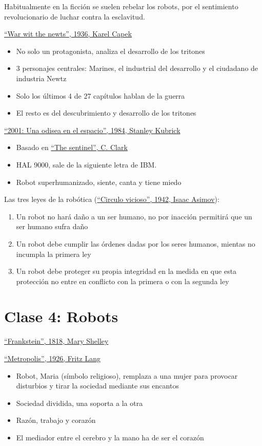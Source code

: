 \documentclass[12pt, twoside, openright]{report} %
\begin{document}
Habitualmente en la ficción se suelen rebelar los robots, por el sentimiento revolucionario de luchar contra la esclavitud.

\underline{\enquote{War wit the newts}, 1936, Karel Capek}
\begin{itemize}
	\item No solo un protagonista, analiza el desarrollo de los tritones
	\item 3 personajes centrales: Marines, el industrial del desarrollo y el ciudadano de industria Newtz
	\item Solo los últimos 4 de 27 capítulos hablan de la guerra
	\item El resto es del descubrimiento y desarrollo de los tritones
\end{itemize}

\underline{\enquote{2001: Una odisea en el espacio}, 1984, Stanley Kubrick}
\begin{itemize}
	\item Basado en \underline{\enquote{The sentinel}, C. Clark}
	\item HAL 9000, sale de la siguiente letra de IBM.
	\item Robot superhumanizado, siente, canta y tiene miedo
\end{itemize}

Las tres leyes de la robótica (\underline{\enquote{Circulo vicioso}, 1942, Isaac Asimov}):
\begin{enumerate}
	\item Un robot no hará daño a un ser humano, no por inacción permitirá que un ser humano sufra daño
	\item Un robot debe cumplir las órdenes dadas por los seres humanos, mientas no incumpla la primera ley
	\item Un robot debe proteger su propia integridad en la medida en que esta protección no entre en conflicto con la primera o con la segunda ley
\end{enumerate}

\chapter{Clase 4: Robots}
\underline{\enquote{Frankstein}, 1818, Mary Shelley}

\underline{\enquote{Metropolis}, 1926, Fritz Lang}
\begin{itemize}
	\item Robot, Maria (símbolo religioso), remplaza a una mujer para provocar disturbios y tirar la sociedad mediante sus encantos
	\item Sociedad dividida, una soporta a la otra
	\item Razón, trabajo y corazón
	\item El mediador entre el cerebro y la mano ha de ser el corazón
\end{itemize}
\end{document}
